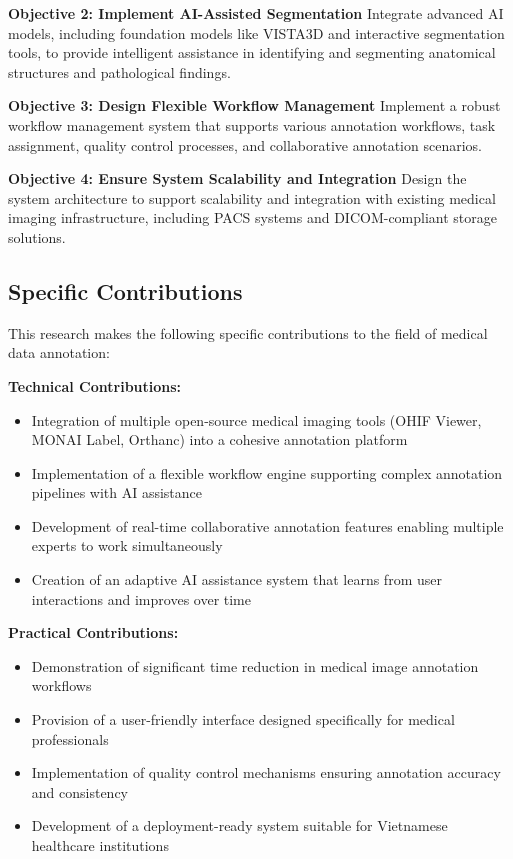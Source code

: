 \textbf{Objective 2: Implement AI-Assisted Segmentation}
Integrate advanced AI models, including foundation models like VISTA3D and interactive segmentation tools, to provide intelligent assistance in identifying and segmenting anatomical structures and pathological findings.

\textbf{Objective 3: Design Flexible Workflow Management}
Implement a robust workflow management system that supports various annotation workflows, task assignment, quality control processes, and collaborative annotation scenarios.

\textbf{Objective 4: Ensure System Scalability and Integration}
Design the system architecture to support scalability and integration with existing medical imaging infrastructure, including PACS systems and DICOM-compliant storage solutions.

\subsection{Specific Contributions}

This research makes the following specific contributions to the field of medical data annotation:

\textbf{Technical Contributions:}
\begin{itemize}
    \item Integration of multiple open-source medical imaging tools (OHIF Viewer, MONAI Label, Orthanc) into a cohesive annotation platform
    \item Implementation of a flexible workflow engine supporting complex annotation pipelines with AI assistance
    \item Development of real-time collaborative annotation features enabling multiple experts to work simultaneously
    \item Creation of an adaptive AI assistance system that learns from user interactions and improves over time
\end{itemize}

\textbf{Practical Contributions:}
\begin{itemize}
    \item Demonstration of significant time reduction in medical image annotation workflows
    \item Provision of a user-friendly interface designed specifically for medical professionals
    \item Implementation of quality control mechanisms ensuring annotation accuracy and consistency
    \item Development of a deployment-ready system suitable for Vietnamese healthcare institutions
\end{itemize}

